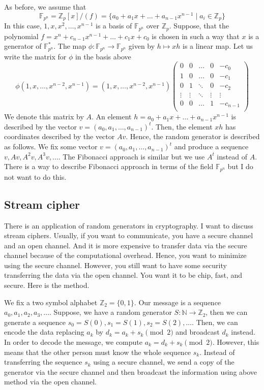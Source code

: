 As before, we assume that
\[
\mathbb F_{p^n} = \mathbb Z_p[x]/(f)= \{a_0 + a_1 x + \ldots + a_{n-1}x^{n-1}\mid a_i\in \mathbb Z_p\}
\]
In this case, $1, x, x^2,\ldots,x^{n-1}$ is a basis of $\mathbb F_{p^n}$ over $\mathbb Z_p$.
Suppose, that the polynomial $f = x^n + c_{n-1}x^{n-1} +\ldots + c_1 x + c_0$ is chosen in such a way that $x$ is a generator of $\mathbb F_{p^n}^*$.
The map $\phi \colon \mathbb F_{p^n}\to \mathbb F_{p^n}$ given by $h \mapsto xh$ is a linear map.
Let us write the matrix for $\phi$ in the basis above
\[
\phi(1, x,\ldots, x^{n-2}, x^{n-1}) = (1, x,\ldots, x^{n-2}, x^{n-1})
\begin{pmatrix}
{0}&{0}&{\ldots}&{0}&{-c_0}\\
{1}&{0}&{\ldots}&{0}&{-c_1}\\
{0}&{1}&{\ddots}&{0}&{-c_2}\\
{\vdots}&{\vdots}&{\ddots}&{\vdots}&{\vdots}\\
{0}&{0}&{\ldots}&{1}&{-c_{n-1}}\\
\end{pmatrix}
\]
We denote this matrix by $A$.
An element $h= a_0 + a_1 x + \ldots + a_{n-1}x^{n-1}$ is described by the vector $v = (a_0,a_1,\ldots,a_{n-1})^t$.
Then, the element $xh$ has coordinates described by the vector $Av$.
Hence, the random generator is described as follows.
We fix some vector $v = (a_0,a_1,\ldots,a_{n-1})^t$ and produce a sequence $v, Av, A^2v, A^3v, \ldots$.
The Fibonacci approach is similar but we use $A^t$ instead of $A$.
There is a way to describe Fibonacci approach in terms of the field $\mathbb F_{p^n}$ but I do not want to do this.

\subsection{Stream cipher}

There is an application of random generators in cryptography.
I want to discuss stream ciphers.
Usually, if you want to communicate, you have a secure channel and an open channel.
And it is more expensive to transfer data via the secure channel because of the computational overhead.
Hence, you want to minimize using the secure channel.
However, you still want to have some security transferring the data via the open channel.
You want it to be chip, fast, and secure.
Here is the method.

We fix a two symbol alphabet $\mathbb Z_2=\{0,1\}$.
Our message is a sequence $a_0, a_1, a_2,a_3,\ldots$.
Suppose, we have a random generator $S\colon \mathbb N \to \mathbb Z_2$, then we can generate a sequence $s_0 = S(0), s_1 = S(1), s_2 = S(2),\ldots$.
Then, we can encode the data replacing $a_k$  by $d_k = a_k + s_k\pmod 2$ and broadcast $d_k$ instead.
In order to decode the message, we compute $a_k = d_k + s_k \pmod 2$.
However, this means that the other person must know the whole sequence $s_k$.
Instead of transferring the sequence $s_k$ using a secure channel, we send a copy of the generator via the secure channel and then broadcast the information using above method via the open channel.

